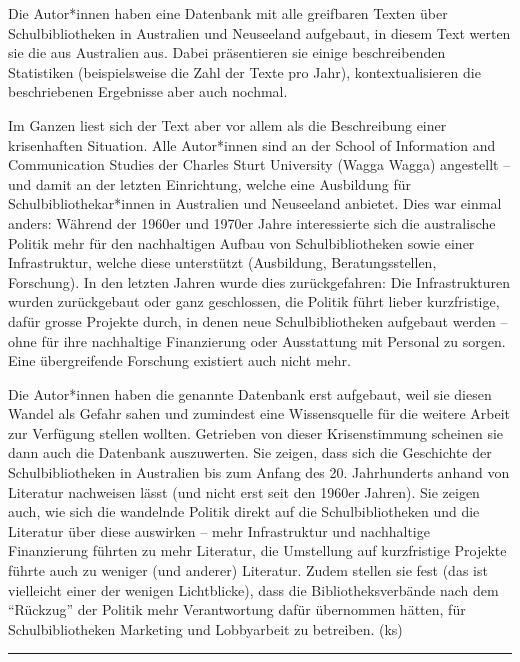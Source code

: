 \documentclass[a4paper,
fontsize=11pt,
oneside,
numbers=noperiodatend,
parskip=half-,
bibliography=totoc,
final
]{scrartcl}
\begin{document}
Die Autor*innen haben eine Datenbank mit alle greifbaren Texten über
Schulbibliotheken in Australien und Neuseeland aufgebaut, in diesem Text
werten sie die aus Australien aus. Dabei präsentieren sie einige
beschreibenden Statistiken (beispielsweise die Zahl der Texte pro Jahr),
kontextualisieren die beschriebenen Ergebnisse aber auch nochmal.

Im Ganzen liest sich der Text aber vor allem als die Beschreibung einer
krisenhaften Situation. Alle Autor*innen sind an der School of
Information and Communication Studies der Charles Sturt University
(Wagga Wagga) angestellt -- und damit an der letzten Einrichtung, welche
eine Ausbildung für Schulbibliothekar*innen in Australien und Neuseeland
anbietet. Dies war einmal anders: Während der 1960er und 1970er Jahre
interessierte sich die australische Politik mehr für den nachhaltigen
Aufbau von Schulbibliotheken sowie einer Infrastruktur, welche diese
unterstützt (Ausbildung, Beratungsstellen, Forschung). In den letzten
Jahren wurde dies zurückgefahren: Die Infrastrukturen wurden
zurückgebaut oder ganz geschlossen, die Politik führt lieber
kurzfristige, dafür grosse Projekte durch, in denen neue
Schulbibliotheken aufgebaut werden – ohne für ihre nachhaltige
Finanzierung oder Ausstattung mit Personal zu sorgen. Eine übergreifende
Forschung existiert auch nicht mehr.

Die Autor*innen haben die genannte Datenbank erst aufgebaut, weil sie
diesen Wandel als Gefahr sahen und zumindest eine Wissensquelle für die
weitere Arbeit zur Verfügung stellen wollten. Getrieben von dieser
Krisenstimmung scheinen sie dann auch die Datenbank auszuwerten. Sie
zeigen, dass sich die Geschichte der Schulbibliotheken in Australien bis
zum Anfang des 20. Jahrhunderts anhand von Literatur nachweisen lässt
(und nicht erst seit den 1960er Jahren). Sie zeigen auch, wie sich die
wandelnde Politik direkt auf die Schulbibliotheken und die Literatur
über diese auswirken -- mehr Infrastruktur und nachhaltige Finanzierung
führten zu mehr Literatur, die Umstellung auf kurzfristige Projekte
führte auch zu weniger (und anderer) Literatur. Zudem stellen sie fest
(das ist vielleicht einer der wenigen Lichtblicke), dass die
Bibliotheksverbände nach dem \enquote{Rückzug} der Politik mehr
Verantwortung dafür übernommen hätten, für Schulbibliotheken Marketing
und Lobbyarbeit zu betreiben. (ks)

\begin{center}\rule{0.5\linewidth}{0.5pt}\end{center}
\end{document}
